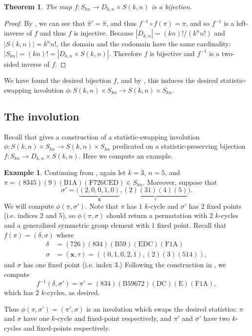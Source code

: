 \documentclass{article}
\newtheorem{theorem}{Theorem}[section]
\numberwithin{theorem}{section}
\theoremstyle{definition}
\newtheorem{example}{Example}
\newcommand\pihat{\hat{\pi}}
\newcommand{\x}{\mathbf x}
\newcommand{\xtau}{(\x,\tau)}
\begin{document}
\begin{theorem}
    The map $f \colon S_{kn} \to D_{k,n} \times S(k,n)$ is a bijection.
\end{theorem}
\begin{proof}
    By , we can see that ${\hat\pi}' = \pihat$, and thus $f^{-1} \circ f(\pi) = \pi$, and so $f^{-1}$ is a left-inverse of $f$ and thus $f$ is injective. Because $|D_{k,n}| = (kn)!/(k^nn!)$ and $|S(k,n)| = k^nn!$, the domain and the codomain have the same cardinality: $|S_{kn}| = (kn)! = |D_{k,n} \times S(k,n)|$. Therefore $f$ is bijective and $f^{-1}$ is a two-sided inverse of $f$.
\end{proof}

We have found the desired bijection $f$, and by , this induces the desired statistic-swapping involution $\phi: S(k,n)\times S_{kn}\to S(k,n)\times S_{kn}$.

\subsection{The involution}
Recall that  gives a construction of a statistic-swapping involution $\phi\colon S(k,n) \times S_{kn} \to S(k,n) \times S_{kn}$ predicated on a statistic-preserving bijection $f\colon S_{kn} \to D_{k,n} \times S(k,n)$. Here we compute an example.
\begin{example}
    Continuing from , again let $k = 3$, $n=5$, and \(\pi = \mathrm{(8345)(9)(B1A)(F726CED)} \in S_{kn}\). Moreover, suppose that \[
        \sigma' = \big(\underbrace{(2,0,0,1,0)}_{\x},\underbrace{(2)(31)(4)(5)}_\tau\big).
    \] We will compute $\phi(\pi,\sigma')$. Note that $\pi$ has $1$ $k$-cycle and $\sigma'$ has $2$ fixed points (i.e. indices $2$ and $5$), so $\phi(\pi,\sigma)$ should return a permutation with $2$ $k$-cycles and a generalized symmetric group element with $1$ fixed point. Recall that \(f(\pi) = (\delta,\sigma)\) where \begin{align*}
        \delta &= \mathrm{(726)(834)(B59)(EDC)(F1A)} \\
        \sigma &= \xtau = \left((0,1,0,2,1),(2)(3)(514)\right),
    \end{align*}
    and $\sigma$ has one fixed point (i.e. index $3$.)
    Following the construction in , we compute \[
        f^{-1}(\delta, \sigma') = \pi'= \mathrm{(834)(B59672)(DC)(E)(F1A)},
    \] which has $2$ $k$-cycles, as desired.

    Thus \(\phi(\pi,\sigma') = (\pi',\sigma)\) is an involution which swaps the desired statistics: $\pi$ and $\sigma$ have one $k$-cycle and fixed-point respectively, and $\pi'$ and $\sigma'$ have two $k$-cycles and fixed-points respectively.
\end{example}
\end{document}
